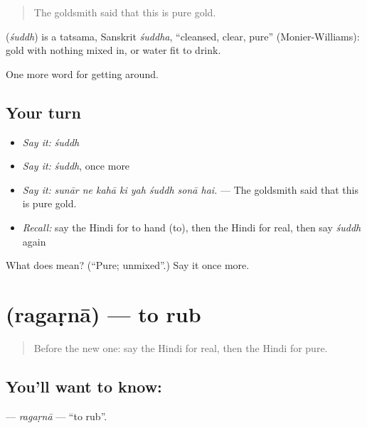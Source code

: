 \begin{quote}
The goldsmith said that this is pure gold.
\end{quote}

\begin{cousinweb}
\textbf{} (\emph{śuddh}) is a tatsama, Sanskrit \emph{śuddha}, \textquotedblleft{}cleansed, clear, pure\textquotedblright{} (Monier-Williams): gold with nothing mixed in, or water fit to drink.
\end{cousinweb}

\begin{grammarlens}[title={What you've built}]
One more word for getting around.
\end{grammarlens}

\subsection*{Your turn}
\begin{itemize}
\raggedright
  \item \emph{Say it:} \emph{śuddh}
  \item \emph{Say it:} \emph{śuddh}, once more
  \item \emph{Say it:} \emph{sunār ne kahā ki yah śuddh sonā hai.} — The goldsmith said that this is pure gold.
  \item \emph{Recall:} say the Hindi for to hand (to), then the Hindi for real, then say \emph{śuddh} again
\end{itemize}

\begin{tcolorbox}[breakable,colback=teal!4,colframe=teal!35!black,title={Before you move on}]
What does  mean? (\textquotedblleft{}Pure; unmixed\textquotedblright{}.) Say it once more.
\end{tcolorbox}
\section[\texorpdfstring{\hi{रगड़ना} (ragaṛnā)}{रगड़ना (ragaṛnā)}]{ (ragaṛnā) — to rub}

\label{lesson:HI-C434-ragarna}



\begin{quote}
Before the new one: say the Hindi for real, then the Hindi for pure.
\end{quote}

\subsection*{You'll want to know: }
\textbf{} — \emph{ragaṛnā} — \textquotedblleft{}to rub\textquotedblright{}.

